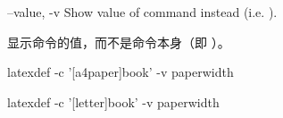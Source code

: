 \begin{docKey}
  {--value, -v}{}%
  {}%
  Show value of command instead (i.e. ).

  显示命令的值，而不是命令本身（即 ）。

\begin{commandshell} 
latexdef -c '[a4paper]{book}' -v paperwidth
\end{commandshell}  

\begin{commandshell} 
latexdef -c '[letter]{book}'  -v paperwidth
\end{commandshell}  
\end{docKey}